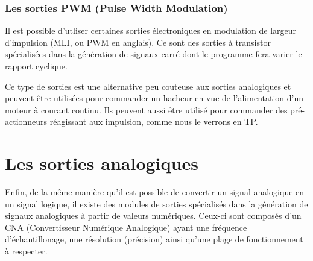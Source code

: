 \documentclass[11pt]{article}
\begin{document}
\subsubsection{Les sorties PWM (Pulse Width Modulation)}
Il est possible d'utliser certaines sorties électroniques en modulation de largeur d'impulsion (MLI, ou PWM en anglais). Ce sont des sorties à transistor spécialisées dans la génération de signaux carré dont le programme fera varier le rapport cyclique.

Ce type de sorties est une alternative peu couteuse aux sorties analogiques et peuvent être utilisées pour commander un hacheur en vue de l'alimentation d'un moteur à courant continu. Ils peuvent aussi être utilisé pour commander des pré-actionneurs réagissant aux impulsion, comme nous le verrons en TP.
\pagebreak
\section{Les sorties analogiques}
Enfin, de la même manière qu'il est possible de convertir un signal analogique en un signal logique, il existe des modules de sorties spécialisés dans la génération de signaux analogiques à partir de valeurs numériques. Ceux-ci sont composés d'un CNA (Convertisseur Numérique Analogique) ayant une fréquence d'échantillonage, une résolution (précision) ainsi qu'une plage de fonctionnement à respecter.



\begin{UPSTIactivite}
	\vspace{2cm}
	\vspace{2cm}
\end{UPSTIactivite}
\end{document}
